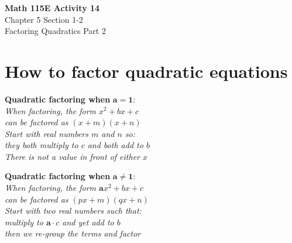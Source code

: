 \documentclass[12pt]{article}
\begin{document}
\begin{center}
    \Large \textbf{Math 115E Activity 14} \\
    \vspace{0.2cm}
    \normalsize Chapter 5 Section 1-2 \\
    \normalsize Factoring Quadratics Part 2
\end{center}
\vspace{-0.5cm}
\noindent
\section*{How to factor quadratic equations}
\noindent
\begin{minipage}[t]{0.48\textwidth}
\begin{tcolorbox}[
    width=\linewidth,
    colframe=black,         %
    colback=white,          %
    boxrule=0.5pt,          %
    left=1mm, right=1.1mm,    %
    top=1mm, bottom=1mm,    %
    arc=2mm                 %
]
\textbf{Quadratic factoring when} $\mathbf{a = 1}$: \\ 
\textit{When factoring, the form $x^2 + bx + c$ \\
can be factored as $(x+m)(x+n)$\\
Start with real numbers $m$ and $n$ so: \\
they both multiply to $c$ and both add to $b$\\
There is not a value in front of either $x$}
\end{tcolorbox}
\end{minipage}%
\hfill
\begin{minipage}[t]{0.48\textwidth}
\begin{tcolorbox}[
    width=\linewidth,
    colframe=black,         %
    colback=white,          %
    boxrule=0.5pt,          %
    left=1mm, right=1.1mm,    %
    top=1mm, bottom=1mm,    %
    arc=2mm                 %
]
\textbf{Quadratic factoring when} $\mathbf{a \neq 1}$: \\ 
\textit{When factoring, the form $\boldsymbol{a}x^2 + bx + c$ \\
can be factored as $(px+m)(qx+n)$\\
Start with two real numbers such that: \\
multiply to $\boldsymbol{a} \cdot c$ and yet add to $b$ \\
then we re-group the terms and factor}
\end{tcolorbox}
\end{minipage}
\end{document}
